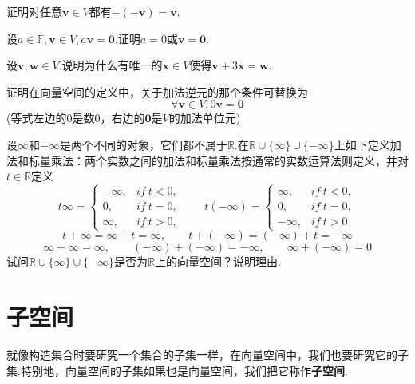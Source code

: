 \documentclass[lang=cn, zihao=5]{elegantbook}
\newcommand{\R}{\mathbb{R}}
\newcommand{\F}{\mathbb{F}}
\begin{document}
\begin{exercise}
	证明对任意$\boldsymbol{v} \in V$都有$-(\boldsymbol{-v})=\boldsymbol{v}$.
\end{exercise}

\begin{exercise}
	设$a \in \F, \boldsymbol{v} \in V, a\boldsymbol{v}=\boldsymbol{0}$.证明$a=0$或$\boldsymbol{v}=\boldsymbol{0}$.
\end{exercise}

\begin{exercise}
	设$\boldsymbol{v},\boldsymbol{w} \in V$.说明为什么有唯一的$\boldsymbol{x} \in V$使得$\boldsymbol{v} + 3\boldsymbol{x} = \boldsymbol{w}$.
\end{exercise}

\begin{exercise}
	证明在向量空间的定义中，关于加法逆元的那个条件可替换为$$\forall \boldsymbol{v} \in V, 0\boldsymbol{v}=\boldsymbol{0}$$
	(等式左边的$0$是数$0$，右边的$\boldsymbol{0}$是$V$的加法单位元)
\end{exercise}

\begin{exercise}
	设$\infty$和$-\infty$是两个不同的对象，它们都不属于$\R$.在$\R \cup \{ \infty \} \cup \{ -\infty \}$上如下定义加法和标量乘法：两个实数之间的加法和标量乘法按通常的实数运算法则定义，并对$t \in \R$定义$$
	t\infty = \begin{cases}
		-\infty , &if ~ t<0, \\
		0 , &if ~ t=0, \\
		\infty , &if ~ t>0,
	\end{cases} \qquad
	t(-\infty) = \begin{cases}
		\infty , &if ~ t<0, \\
		0 , &if ~ t=0, \\
		-\infty , &if ~ t>0
	\end{cases}$$
	$$t + \infty = \infty + t = \infty , \qquad t+(-\infty) = (-\infty)+t = -\infty$$
	$$\infty + \infty = \infty , \qquad (-\infty) + (-\infty) = -\infty , \qquad \infty + (-\infty) = 0$$
	试问$\R \cup \{ \infty \} \cup \{ -\infty \}$是否为$\R$上的向量空间？说明理由.
\end{exercise}


\newpage
\section{子空间}

就像构造集合时要研究一个集合的子集一样，在向量空间中，我们也要研究它的子集.特别地，向量空间的子集如果也是向量空间，我们把它称作\textbf{子空间}.
\end{document}
